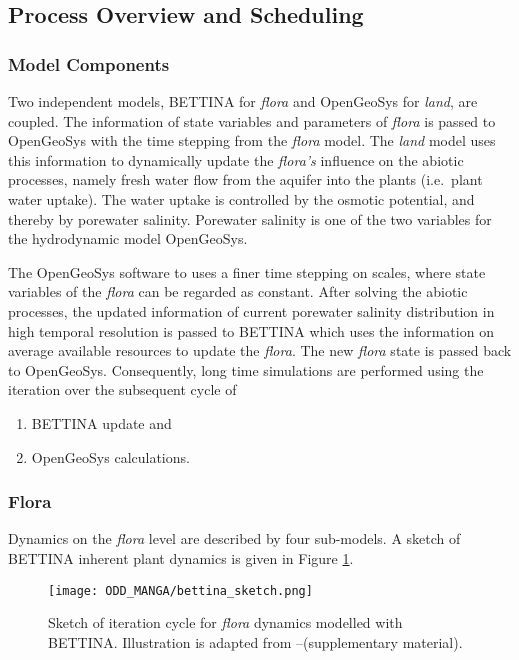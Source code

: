 \subsection{Process Overview and Scheduling}
\subsubsection{Model Components} 
Two independent models, BETTINA for \textit{flora} and OpenGeoSys for \textit{land}, are coupled.
The information of state variables and parameters of \textit{flora} is passed to OpenGeoSys with the time stepping from the \textit{flora} model.
The \textit{land} model uses this information to dynamically update the \textit{flora's} influence on the abiotic processes, namely fresh water flow from the aquifer into the plants (i.e.~plant water uptake).
The water uptake is controlled by the osmotic potential, and thereby by porewater salinity.
Porewater salinity is one of the two variables for the hydrodynamic model OpenGeoSys.

The OpenGeoSys software to uses a finer time stepping on scales, where state variables of the \textit{flora} can be regarded as constant.
After solving the abiotic processes, the updated information of current porewater salinity distribution in high temporal resolution is passed to BETTINA which uses the information on average available resources to update the \textit{flora}.
The new \textit{flora} state is passed back to OpenGeoSys.
Consequently, long time simulations are performed using the iteration over the subsequent cycle of
\begin{enumerate}
\item BETTINA update and
\item OpenGeoSys calculations.

\end{enumerate}

\subsubsection{Flora}
Dynamics on the \textit{flora} level are described by four sub-models.
A sketch of BETTINA inherent plant dynamics is given in Figure \ref{fig_bettina_sketch}.
\begin{figure}[h]\centering
\texttt{[image: ODD\_MANGA/bettina\_sketch.png]} 
\caption{Sketch of iteration cycle for \textit{flora} dynamics modelled with BETTINA. Illustration is adapted from \citet{Ronny2014}--(supplementary material).}\label{fig_bettina_sketch}
\end{figure} 

